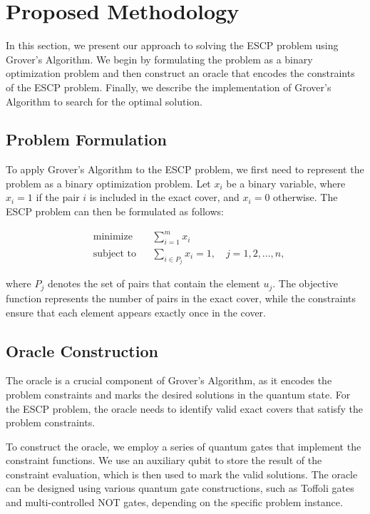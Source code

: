 \section{Proposed Methodology} \label{sec:methodology}

In this section, we present our approach to solving the ESCP problem using Grover's Algorithm. We begin by formulating the problem as a binary optimization problem and then construct an oracle that encodes the constraints of the ESCP problem. Finally, we describe the implementation of Grover's Algorithm to search for the optimal solution.

\subsection{Problem Formulation}

To apply Grover's Algorithm to the ESCP problem, we first need to represent the problem as a binary optimization problem. Let $x_i$ be a binary variable, where $x_i = 1$ if the pair $i$ is included in the exact cover, and $x_i = 0$ otherwise. The ESCP problem can then be formulated as follows:

\begin{equation}
\begin{aligned}
& \text{minimize} & & \sum_{i=1}^m x_i \\
& \text{subject to} & & \sum_{i \in P_j} x_i = 1, \quad j = 1, 2, \dots, n,
\end{aligned}
\end{equation}

where $P_j$ denotes the set of pairs that contain the element $u_j$. The objective function represents the number of pairs in the exact cover, while the constraints ensure that each element appears exactly once in the cover.

\subsection{Oracle Construction}

The oracle is a crucial component of Grover's Algorithm, as it encodes the problem constraints and marks the desired solutions in the quantum state. For the ESCP problem, the oracle needs to identify valid exact covers that satisfy the problem constraints.

To construct the oracle, we employ a series of quantum gates that implement the constraint functions. We use an auxiliary qubit to store the result of the constraint evaluation, which is then used to mark the valid solutions. The oracle can be designed using various quantum gate constructions, such as Toffoli gates and multi-controlled NOT gates, depending on the specific problem instance.

